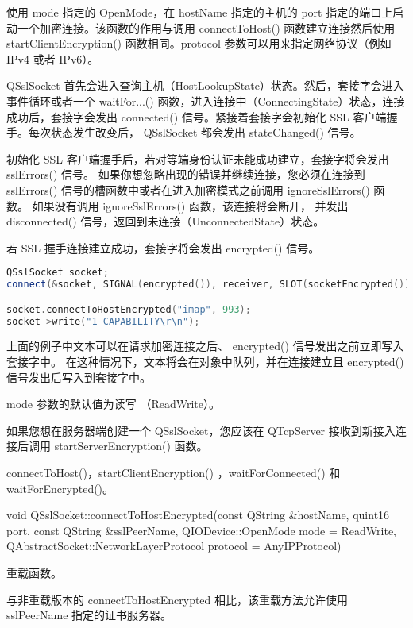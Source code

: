 使用 mode 指定的 OpenMode，在 hostName 指定的主机的 port 指定的端口上启动一个加密连接。该函数的作用与调用 connectToHost() 函数建立连接然后使用 startClientEncryption() 函数相同。protocol 参数可以用来指定网络协议（例如 IPv4 或者 IPv6）。

QSslSocket 首先会进入查询主机（HostLookupState）状态。然后，套接字会进入事件循环或者一个 waitFor...() 函数，进入连接中（ConnectingState）状态，连接成功后，套接字会发出 connected() 信号。紧接着套接字会初始化 SSL 客户端握手。每次状态发生改变后， QSslSocket 都会发出 stateChanged() 信号。

初始化 SSL 客户端握手后，若对等端身份认证未能成功建立，套接字将会发出 sslErrors() 信号。
如果你想忽略出现的错误并继续连接，您必须在连接到 sslErrors() 
信号的槽函数中或者在进入加密模式之前调用 ignoreSslErrors() 函数。
如果没有调用 ignoreSslErrors() 函数，该连接将会断开，
并发出 disconnected() 信号，返回到未连接（UnconnectedState）状态。

若 SSL 握手连接建立成功，套接字将会发出 encrypted() 信号。

\begin{lstlisting}[language=C++]
QSslSocket socket;
connect(&socket, SIGNAL(encrypted()), receiver, SLOT(socketEncrypted()));

socket.connectToHostEncrypted("imap", 993);
socket->write("1 CAPABILITY\r\n");
\end{lstlisting}

\begin{notice}
上面的例子中文本可以在请求加密连接之后、 encrypted() 信号发出之前立即写入套接字中。
在这种情况下，文本将会在对象中队列，并在连接建立且 encrypted() 信号发出后写入到套接字中。
\end{notice}

mode 参数的默认值为读写 （ReadWrite）。

如果您想在服务器端创建一个 QSslSocket，您应该在 QTcpServer 接收到新接入连接后调用 startServerEncryption() 函数。

\begin{seeAlso}
connectToHost()，startClientEncryption() ，waitForConnected() 和 waitForEncrypted()。
\end{seeAlso}


void QSslSocket::connectToHostEncrypted(const QString \&hostName, quint16 port, const QString \&sslPeerName, QIODevice::OpenMode mode = ReadWrite, QAbstractSocket::NetworkLayerProtocol protocol = AnyIPProtocol)

重载函数。

与非重载版本的 connectToHostEncrypted 相比，该重载方法允许使用 sslPeerName 指定的证书服务器。

